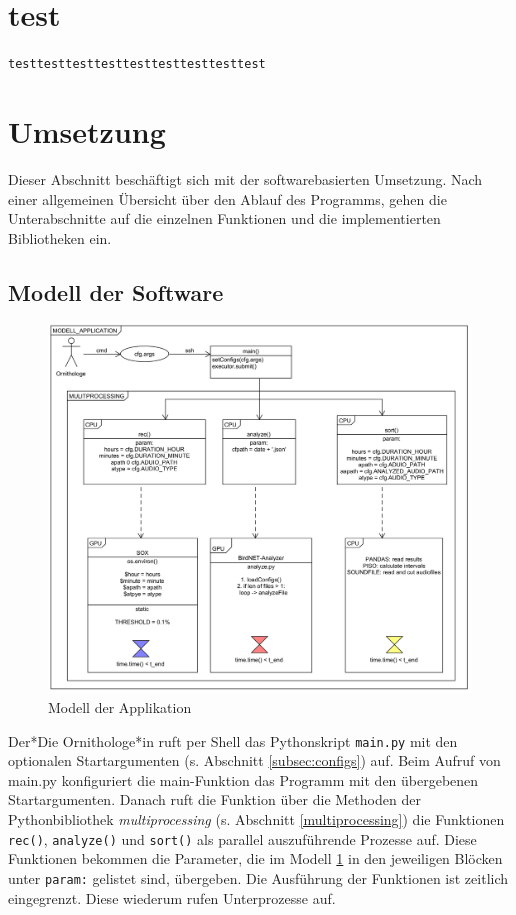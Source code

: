 \section{test}

\lstinline{testtesttesttesttesttesttesttesttest}


\section{Umsetzung}
\label{sec:umsetzung}
Dieser Abschnitt beschäftigt sich mit der softwarebasierten Umsetzung. Nach einer allgemeinen Übersicht über den Ablauf des Programms, gehen die Unterabschnitte auf die einzelnen Funktionen und die implementierten Bibliotheken ein.


\subsection{Modell der Software}
\label{subsec:softwaremodell}

\begin{figure}
    \centering
    \includegraphics[width=1\linewidth]{bilder/modell_app_2.png}
 \caption{Modell der Applikation}
    \label{fig:model_app}
\end{figure}

Der*Die Ornithologe*in ruft per Shell das Pythonskript \texttt{main.py} mit den optionalen Startargumenten (s. Abschnitt \ref{subsec:configs}) auf. Beim Aufruf von main.py konfiguriert die main-Funktion das Programm mit den übergebenen Startargumenten. Danach ruft die Funktion über die Methoden der Pythonbibliothek \textit{multiprocessing} (s. Abschnitt \ref{multiprocessing}) die Funktionen \texttt{rec()}, \texttt{analyze()} und \texttt{sort()} als parallel auszuführende Prozesse auf. Diese Funktionen bekommen die Parameter, die im Modell \ref{fig:model_app} in den jeweiligen Blöcken unter \texttt{param:} gelistet sind, übergeben. Die Ausführung der Funktionen ist zeitlich eingegrenzt. Diese wiederum rufen Unterprozesse auf. 


